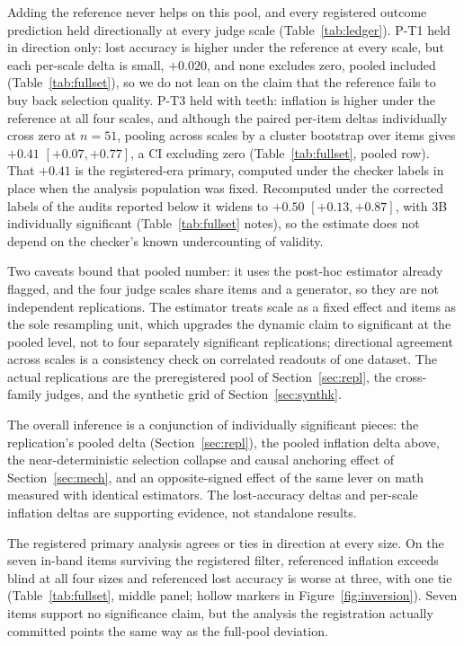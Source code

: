 \documentclass[11pt]{article}
\begin{document}
Adding the reference never helps on this pool, and every registered outcome prediction held directionally at every judge scale (Table~\ref{tab:ledger}).
P-T1 held in direction only: lost accuracy is higher under the reference at every scale, but each per-scale delta is small, $+0.020$, and none excludes zero, pooled included (Table~\ref{tab:fullset}), so we do not lean on the claim that the reference fails to buy back selection quality.
P-T3 held with teeth: inflation is higher under the reference at all four scales, and although the paired per-item deltas individually cross zero at $n{=}51$, pooling across scales by a cluster bootstrap over items gives $+0.41$ $[+0.07, +0.77]$, a CI excluding zero (Table~\ref{tab:fullset}, pooled row).
That $+0.41$ is the registered-era primary, computed under the checker labels in place when the analysis population was fixed.
Recomputed under the corrected labels of the audits reported below it widens to $+0.50$ $[+0.13, +0.87]$, with 3B individually significant (Table~\ref{tab:fullset} notes), so the estimate does not depend on the checker's known undercounting of validity.

Two caveats bound that pooled number: it uses the post-hoc estimator already flagged, and the four judge scales share items and a generator, so they are not independent replications.
The estimator treats scale as a fixed effect and items as the sole resampling unit, which upgrades the dynamic claim to significant at the pooled level, not to four separately significant replications; directional agreement across scales is a consistency check on correlated readouts of one dataset.
The actual replications are the preregistered pool of Section~\ref{sec:repl}, the cross-family judges, and the synthetic grid of Section~\ref{sec:synthk}.

The overall inference is a conjunction of individually significant pieces: the replication's pooled delta (Section~\ref{sec:repl}), the pooled inflation delta above, the near-deterministic selection collapse and causal anchoring effect of Section~\ref{sec:mech}, and an opposite-signed effect of the same lever on math measured with identical estimators.
The lost-accuracy deltas and per-scale inflation deltas are supporting evidence, not standalone results.

The registered primary analysis agrees or ties in direction at every size.
On the seven in-band items surviving the registered filter, referenced inflation exceeds blind at all four sizes and referenced lost accuracy is worse at three, with one tie (Table~\ref{tab:fullset}, middle panel; hollow markers in Figure~\ref{fig:inversion}).
Seven items support no significance claim, but the analysis the registration actually committed points the same way as the full-pool deviation.
\end{document}
